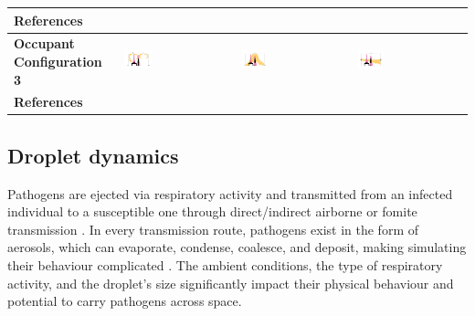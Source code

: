 \documentclass[a4paper,12pt]{elsarticle}
\begin{document}
\begin{table}[ht]
\begin{tabular}{|m{2.5cm}|m{4cm}|m{4cm}|m{4cm}|}
    \hline
    \textbf{References} & \cite{he2011cfd,yan2021transmission,mirzaie2021covid,li2021effects,shao2021risk,qin2023transmission,xu2023cfd} & \cite{he2011cfd,lu2022ventilation,jain2023numerical} & \cite{ho2021modeling,duill2021impact,ren2022practical,lu2022ventilation} \\
    \hline
    \textbf{Occupant Configuration 3} &\includegraphics[clip,trim={0 2cm 0 2cm},width=0.25\textwidth]{Airflow/mat3.jpeg}& \includegraphics[clip,trim={0 2cm 0 2cm},width=0.25\textwidth]{Airflow/mat6.jpeg}& \includegraphics[clip,trim={0 2cm 0 2cm},width=0.25\textwidth]{Airflow/mat9.jpeg} \\
    \hline
    \textbf{References} & \cite{hang2014influence,romano2015numerical,liu2020full,lu2020reducing,zhou2021experimental,guo2022visualization,liu2023estimating} & \cite{zhou2021experimental,villafruela2019assessment,lu2020reducing} & \cite{jiang2009investigating,lu2020reducing} \\
    \hline
    \end{tabular}

\end{table}

\subsection{Droplet dynamics}

Pathogens are ejected via respiratory activity and transmitted from an infected individual to a susceptible one through direct/indirect airborne or fomite transmission \cite{leung2021transmissibility}. In every transmission route, pathogens exist in the form of aerosols, which can evaporate, condense, coalesce, and deposit, making simulating their behaviour complicated \cite{rosti2020fluid,zhou2021dynamical}. The ambient conditions, the type of respiratory activity, and the droplet's size significantly impact their physical behaviour and potential to carry pathogens across space.
\end{document}
